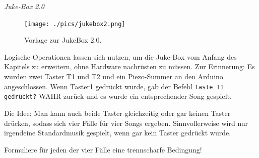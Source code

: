 \begin{aufgabe} \emph{Juke-Box 2.0} \label{aufg:jukebox-2}
	
	\begin{figure}
		\centering
		\texttt{[image: ./pics/jukebox2.png]}
		\caption{Vorlage zur JukeBox 2.0.}
	\end{figure}
	Logische Operationen lassen sich nutzen, um die Juke-Box vom Anfang des Kapitels zu erweitern, ohne Hardware nachrüsten zu müssen. Zur Erinnerung: Es wurden zwei Taster T1 und T2 und ein Piezo-Summer an den Arduino angeschlossen. Wenn Taster1 gedrückt wurde, gab der Befehl \texttt{Taste T1 gedrückt?} WAHR zurück und es wurde ein entsprechender Song gespielt.
	
	Die Idee: Man kann auch beide Taster gleichzeitig oder gar keinen Taster drücken, sodass sich vier Fälle für vier Songs ergeben. Sinnvollerweise
	wird nur irgendeine Standardmusik gespielt, wenn gar kein Taster gedrückt wurde.
	
	Formuliere für jeden der vier Fälle eine trennscharfe Bedingung!
	
\end{aufgabe}


%	

